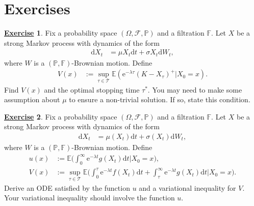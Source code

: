 \documentclass[12pt]{book}
\numberwithin{equation}{chapter}
\theoremstyle{plain}
\numberwithin{theorem}{section}
\theoremstyle{definition}
\newtheorem{exercise}{\underline{Exercise}}
\numberwithin{exercise}{chapter}
\newcommand{\<}{\langle}
\renewcommand{\>}{\rangle}
\renewcommand{\(}{\left(}
\renewcommand{\)}{\right)}
\renewcommand{\[}{\left[}
\renewcommand{\]}{\right]}
\newcommand\Eb{\mathds{E}}
\newcommand\Fb{\mathds{F}}
\newcommand\Pb{\mathds{P}}
\newcommand\Ac{\mathscr{A}}
\newcommand\Fc{\mathscr{F}}
\newcommand\Tc{\mathscr{T}}
\newcommand\Om{\Omega}
\newcommand\sig{\sigma}
\newcommand\lam{\lambda}
\renewcommand\d{\partial}
\newcommand\dd{\mathrm{d}}
\newcommand\ee{\mathrm{e}}
\begin{document}
\section{Exercises}
\label{sec:exercises-12}

\begin{exercise}
\label{exer:12.1}
Fix a probability space $(\Om,\Fc,\Pb)$ and a filtration $\Fb$.
Let $X$ be a strong Markov process with dynamics of the form
\begin{align}
\dd X_t
	&=	\mu X_t \dd t + \sig X_t \dd W_t ,
\end{align}
where $W$ is a $(\Pb,\Fb)$-Brownian motion.  Define
\begin{align} 
V(x)
	&:= \sup_{\tau \in \Tc} \Eb( \ee^{- \lam \tau} (K - X_\tau)^+ | X_0 = x ) .
\end{align}
Find $V(x)$ and the optimal stopping time $\tau^*$.  You may need to make some assumption about $\mu$ to ensure a non-trivial solution.  If so, state this condition.
\end{exercise}

\begin{exercise}
\label{exer:12.2}
Fix a probability space $(\Om,\Fc,\Pb)$ and a filtration $\Fb$.
Let $X$ be a strong Markov process with dynamics of the form
\begin{align}
\dd X_t
	&=	\mu(X_t) \dd t + \sig(X_t) \dd W_t ,
\end{align}
where $W$ is a $(\Pb,\Fb)$-Brownian motion.  Define
\begin{align}
u(x)
	&:=	\Eb \Big( \int_0^\infty \ee^{- \lam t} g(X_t) \dd t \Big| X_0 = x \Big) , \\
V(x)
	&:=	\sup_{\tau \in \Tc} \Eb \Big( \int_0^\tau \ee^{- \lam t} f(X_t) \dd t + \int_\tau^\infty \ee^{- \lam t} g(X_t) \dd t \Big| X_0 = x \Big) .
\end{align}
Derive an ODE satisfied by the function $u$ and a variational inequality for $V$.  Your variational inequality should involve the function $u$.
\end{exercise}
\end{document}
